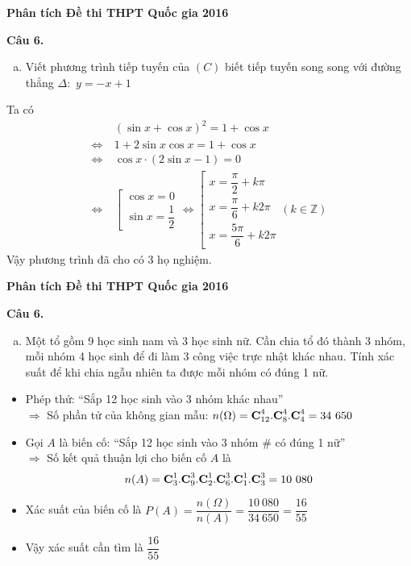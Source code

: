 \documentclass[handout]{beamer} %
\newcommand{\C}{\mbox{\textbf{C}}}
\newcommand{\cau}[2]{\begin{block}{}
		{\color{red}\textbf{Câu #1.}} #2
	\end{block}
}
\begin{document}
	
	\begin{frame}{\textbf{\qquad Phân tích Đề thi THPT Quốc gia 2016}}
		\cau{6}{\begin{enumerate}[a)]
				\item Viết phương trình tiếp tuyến của $(C)$ biết tiếp tuyến song song với đường thẳng $\Delta:$ $y=-x+1$
			\end{enumerate}}
			Ta có 
			\begin{align*}
				&~(\sin x+\cos x)^2=1+\cos x\\
				\Leftrightarrow&~1+2\sin x\cos x=1+\cos x\\
				\Leftrightarrow&~\cos x\cdot(2\sin x-1)=0\\
				\Leftrightarrow&~\left[
				\begin{array}{l}
					\cos x=0\\[8pt]
					\sin x=\dfrac{1}{2}
				\end{array}
				\right.
				\Leftrightarrow \left[
				\begin{array}{l}
					x=\dfrac{\pi}{2}+k\pi\\[8pt]
					x=\dfrac{\pi}{6}+k2\pi\\[8pt]
					x=\dfrac{5\pi}{6}+k2\pi
				\end{array} (k\in\mathbb{Z})\right.
			\end{align*}
			Vậy phương trình đã cho có 3 họ nghiệm.
		\end{frame}
		
		
		\begin{frame}{\textbf{\qquad Phân tích Đề thi THPT Quốc gia 2016}}~\\[-18pt]
			\cau{6}{\begin{enumerate}[b)]
					\item Một tổ gồm 9 học sinh nam và 3 học sinh nữ. Cần chia tổ đó thành 3 nhóm, mỗi nhóm 4 học sinh để đi làm 3 công việc trực nhật khác nhau. Tính xác suất để khi chia ngẫu nhiên ta được mỗi nhóm có đúng 1 nữ.
				\end{enumerate}}
				\begin{itemize}
					\item Phép thử: ``Sắp 12 học sinh vào 3 nhóm khác nhau''\\[4pt]
					$\Rightarrow$ Số phần tử của không gian mẫu: $n(\Omega)=\C_{12}^4.\C^4_8.\C_4^4=34~ 650$\\[5pt]
					\item Gọi $A$ là biến cố: ``Sắp 12 học sinh vào 3 nhóm \# có đúng 1 nữ''\\[4pt]
					$\Rightarrow$ Số kết quả thuận lợi cho biến cố $A$ là $$n(A)=\C_3^1.\C_9^3.\C_2^1.\C_6^3.\C^1_1.\C^3_3=10~080$$
					\item Xác suất của biến cố là
					$P(A)=\dfrac{n(\Omega)}{n(A)}=\dfrac{10~080}{34~ 650}=\dfrac{16}{55}$\\
					\item Vậy xác suất cần tìm là $\dfrac{16}{55}$
				\end{itemize}
			\end{frame}
			
\end{document}
